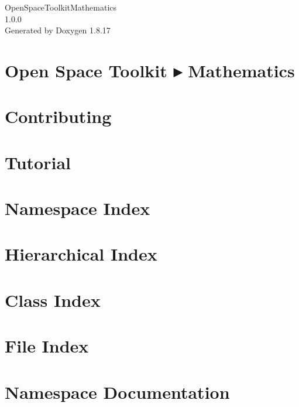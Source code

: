\let\mypdfximage\pdfximage\def\pdfximage{\immediate\mypdfximage}\documentclass[twoside]{book}
\newcommand{\+}{\discretionary{\mbox{\scriptsize$\hookleftarrow$}}{}{}}
\newcommand{\clearemptydoublepage}{%
  \newpage{\pagestyle{empty}\cleardoublepage}%
}
\begin{document}
\hypersetup{pageanchor=false,
             bookmarksnumbered=true,
             pdfencoding=unicode
            }
\begin{titlepage}
\vspace*{7cm}
\begin{center}%
{\Large Open\+Space\+Toolkit\+Mathematics \\[1ex]\large 1.\+0.\+0 }\\
\vspace*{1cm}
{\large Generated by Doxygen 1.8.17}\\
\end{center}
\end{titlepage}
\clearemptydoublepage
{}
\tableofcontents
\clearemptydoublepage
{}
\hypersetup{pageanchor=true}

\chapter{Open Space Toolkit ▸ Mathematics}
\label{index}\hypertarget{index}{}
\chapter{Contributing}
\label{md__c_o_n_t_r_i_b_u_t_i_n_g}

\chapter{Tutorial}
\label{md_docs__tutorial}

\chapter{Namespace Index}

\chapter{Hierarchical Index}

\chapter{Class Index}

\chapter{File Index}

\chapter{Namespace Documentation}













\end{document}
